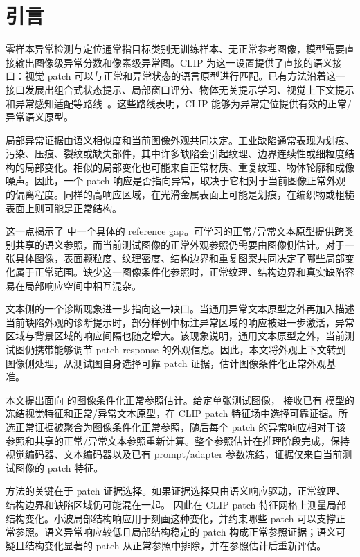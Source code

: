 \section{引言}
\label{sec:introduction}

零样本异常检测与定位通常指目标类别无训练样本、无正常参考图像，模型需要直接输出图像级异常分数和像素级异常图。CLIP 为这一设置提供了直接的语义接口：视觉 patch 可以与正常和异常状态的语言原型进行匹配。已有方法沿着这一接口发展出组合式状态提示、局部窗口评分、物体无关提示学习、视觉上下文提示和异常感知适配等路线~\cite{jeong2023winclip,zhou2024anomalyclip,cao2024adaclip,qu2024vcpclip,ma2025aaclip}。这些路线表明，CLIP 能够为异常定位提供有效的正常/异常语义原型。

局部异常证据由语义相似度和当前图像外观共同决定。工业缺陷通常表现为划痕、污染、压痕、裂纹或缺失部件，其中许多缺陷会引起纹理、边界连续性或细粒度结构的局部变化。相似的局部变化也可能来自正常材质、重复纹理、物体轮廓和成像噪声。因此，一个 patch 响应是否指向异常，取决于它相对于当前图像正常外观的偏离程度。同样的高响应区域，在光滑金属表面上可能是划痕，在编织物或粗糙表面上则可能是正常结构。

这一点揭示了 \clipzsad{} 中一个具体的 reference gap。可学习的正常/异常文本原型提供跨类别共享的语义参照，而当前测试图像的正常外观参照仍需要由图像侧估计。对于一张具体图像，表面颗粒度、纹理密度、结构边界和重复图案共同决定了哪些局部变化属于正常范围。缺少这一图像条件化参照时，正常纹理、结构边界和真实缺陷容易在局部响应空间中相互混杂。

文本侧的一个诊断现象进一步指向这一缺口。当通用异常文本原型之外再加入描述当前缺陷外观的诊断提示时，部分样例中标注异常区域的响应被进一步激活，异常区域与背景区域的响应间隔也随之增大。该现象说明，通用文本原型之外，当前测试图仍携带能够调节 patch response 的外观信息。因此，本文将外观上下文转到图像侧处理，从测试图自身选择可靠 patch 证据，估计图像条件化正常外观基准。

本文提出面向 \clipzsad{} 的图像条件化正常参照估计。给定单张测试图像，\method{} 接收已有 \clipzsad{} 模型的冻结视觉特征和正常/异常文本原型，在 CLIP patch 特征场中选择可靠证据。所选正常证据被聚合为图像条件化正常参照，随后每个 patch 的异常响应相对于该参照和共享的正常/异常文本参照重新计算。整个参照估计在推理阶段完成，保持视觉编码器、文本编码器以及已有 prompt/adapter 参数冻结，证据仅来自当前测试图像的 patch 特征。

方法的关键在于 patch 证据选择。如果证据选择只由语义响应驱动，正常纹理、结构边界和缺陷区域仍可能混在一起。\method{} 因此在 CLIP patch 特征网格上测量局部结构变化。小波局部结构响应用于刻画这种变化，并约束哪些 patch 可以支撑正常参照。语义异常响应较低且局部结构稳定的 patch 构成正常参照证据；语义可疑且结构变化显著的 patch 从正常参照中排除，并在参照估计后重新评估。

